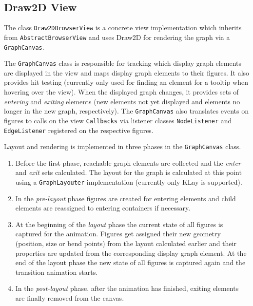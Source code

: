 \subsection{Draw2D View}

The class \lstinline|Draw2DBrowserView| is a concrete view implementation which inherits from 
\lstinline|AbstractBrowserView| and uses Draw2D for rendering the graph via a \lstinline|GraphCanvas|.

The \lstinline|GraphCanvas| class is responsible for tracking which display graph elements are displayed in the view 
and maps display graph elements to their figures. It also provides hit testing (currently only used for finding an 
element for a tooltip when hovering over the view). When the displayed graph changes, it provides sets of 
\emph{entering} and \emph{exiting} elements (new elements not yet displayed and elements no longer in the new graph, 
respectively). The \lstinline|GraphCanvas| also translates events on figures to calls on the view \lstinline|Callbacks| 
via listener classes \lstinline|NodeListener| and \lstinline|EdgeListener| registered on the respective figures.

Layout and rendering is implemented in three phases in the \lstinline|GraphCanvas| class.
\begin{enumerate}[start=0]
  \item Before the first phase, reachable graph elements are collected and the \emph{enter} and \emph{exit} sets 
  calculated. The layout for the graph is calculated at this point using a \lstinline|GraphLayouter| implementation 
  (currently only KLay is supported).
  
  \item In the \emph{pre-layout} phase figures are created for entering elements and child elements are reassigned to 
  entering containers if necessary.
  
  \item At the beginning of the \emph{layout} phase the current state of all figures is captured for the animation. 
  Figures get assigned their new geometry (position, size or bend points) from the layout calculated earlier and their 
  properties are updated from the corresponding display graph element. At the end of the layout phase the new state of 
  all figures is captured again and the transition animation starts.
  
  \item In the \emph{post-layout} phase, after the animation has finished, exiting elements are finally removed from 
  the canvas.
\end{enumerate}

